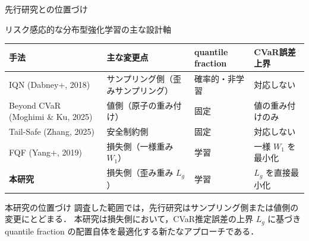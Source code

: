 \documentclass[aspectratio=169, 10pt]{beamer}
\newcommand{\green}[1]{\textcolor{green!40!black}{#1}}
\newcommand{\blue}[1]{\textcolor{blue!80!black}{#1}}
\newcommand{\Lg}{L_g}
\begin{document}
\begin{frame}{先行研究との位置づけ}
  \begin{block}{リスク感応的な分布型強化学習の主な設計軸}
    \centering
    \scriptsize
    \setlength{\tabcolsep}{4pt}
    \begin{tabular}{@{}llll@{}}
      \toprule
      手法 & 主な変更点 & quantile fraction & CVaR誤差上界 \\
      \midrule
      IQN (Dabney+, 2018) & サンプリング側（歪みサンプリング） & 確率的・非学習 & 対応しない \\
      Beyond CVaR (Moghimi \& Ku, 2025) & 値側（原子の重み付け） & 固定 & 値の重み付けのみ \\
      Tail-Safe (Zhang, 2025) & 安全制約側 & 固定 & 対応しない \\
      FQF (Yang+, 2019) & 損失側（一様重み $W_1$） & \green{学習} & 一様 $W_1$ を最小化 \\
      \textbf{本研究} & \alert{損失側（歪み重み $\Lg$）} & \green{学習} & \alert{$\Lg$ を直接最小化} \\
      \bottomrule
    \end{tabular}
  \end{block}
  \begin{exampleblock}{本研究の位置づけ}
    調査した範囲では，先行研究は\blue{サンプリング側}または\blue{値側}の変更にとどまる．
    本研究は\alert{損失側}において，CVaR推定誤差の上界 $\Lg$ に基づき quantile fraction の\alert{配置自体}を最適化する新たなアプローチである．
  \end{exampleblock}
\end{frame}
\end{document}
